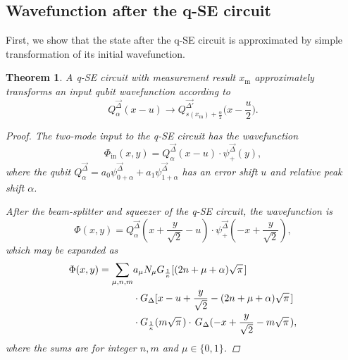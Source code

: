 \documentclass[prx,reprint,superscriptaddress,longbibliography,floatfix,nofootinbib]{revtex4-1}
\newtheorem{theorem}{Theorem}
\begin{document}
\subsection{Wavefunction after the q-SE circuit}
First, we show that the state after the q-SE circuit is approximated by simple transformation of its initial wavefunction. 
\begin{theorem}
\label{result_width_trick_q_QEC} A q-SE circuit  with measurement result $x_\mathrm{m}$ approximately transforms an input qubit wavefunction according to
\begin{equation*}
Q_{\alpha}^{\vec{\Delta}}(x-u)\rightarrow Q_{s(x_\mathrm{m})+\frac{\alpha}{2}}^{\vec{\Delta'}}\big(x-\frac{u}{2}\big).
\end{equation*}

\begin{proof} The two-mode input to the q-SE circuit has the wavefunction \vspace{0.2cm}
\begin{equation}\label{eq:psi_xy}
\Phi_\mathrm{in} (x,y) = Q_{\alpha}^{\vec{\Delta}}(x-u) \cdot \psi_{+}^{\vec{\Delta}}(y),
\end{equation}
where the qubit $Q_{\alpha}^{\vec{\Delta}}= a_{0}\psi_{0+\alpha}^{\vec{\Delta}}+a_{1}\psi_{1+\alpha}^{\vec{\Delta}}$ has an error shift $u$ and relative peak shift $\alpha$.

After the beam-splitter and squeezer of the q-SE circuit, the wavefunction is
\begin{equation}\label{eq:qSE_wavefunction1}
\Phi(x,y) = Q_{\alpha}^{\vec{\Delta}}(x+\frac{y}{\sqrt{2}}-u) \cdot \psi_{+}^{\vec{\Delta}}(-x+\frac{y}{\sqrt{2}}),
\end{equation}
which may be expanded as  
\begin{equation}
\begin{split}
\Phi(x,y)=  \sum_{\mu,n,m} & a_{\mu} N_{\mu} G_{\frac{1}{\kappa}} [(2n+\mu+\alpha)\sqrt{\pi}\hspace{0.04cm}] \\
& \cdot G_{\Delta}[x-u+\frac{y}{\sqrt{2}}-(2n+\mu+\alpha)\sqrt{\pi}\hspace{0.04cm}] \\
& \cdot G_{\frac{1}{\kappa}} (m\sqrt{\pi}\hspace{0.04cm}) \cdot \hspace{0.05cm} G_{\Delta}(-x+\frac{y}{\sqrt{2}}-m\sqrt{\pi} \hspace{0.04cm}),
\end{split} 
\end{equation}
where the sums are for integer $n,m$ and $\mu \in \{0,1\}$.


\end{proof}
\end{theorem}
\end{document}
